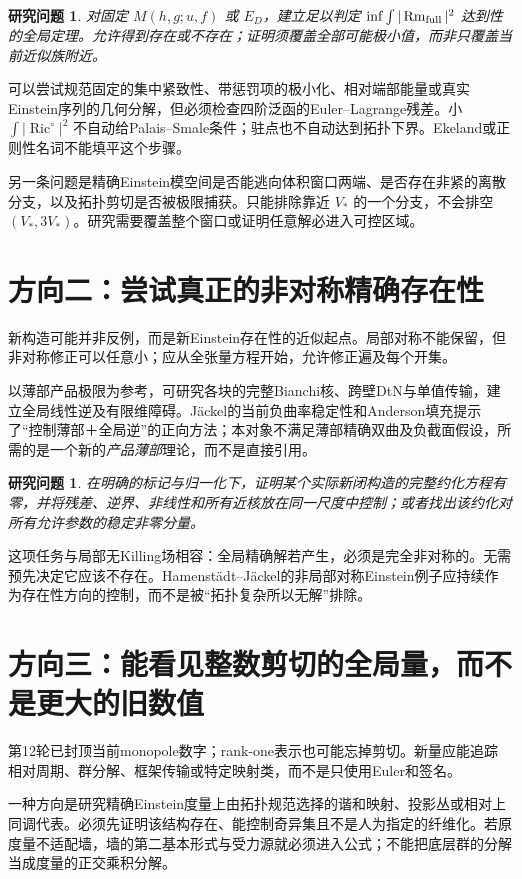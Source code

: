 \documentclass[UTF8,fontset=fandol,zihao=-4]{ctexart}
\theoremstyle{research}
\newtheorem{target}[sourceprop]{研究问题}
\DeclareMathOperator{\Ric}{Ric}\DeclareMathOperator{\Rm}{Rm}
\begin{document}
\begin{target}
对固定 $M(h,g;u,f)$ 或 $E_D$，建立足以判定 $\inf\int|\Rm_{\rm full}|^2$ 达到性的全局定理。允许得到存在或不存在；证明须覆盖全部可能极小值，而非只覆盖当前近似族附近。
\end{target}
可以尝试规范固定的集中紧致性、带惩罚项的极小化、相对端部能量或真实Einstein序列的几何分解，但必须检查四阶泛函的Euler--Lagrange残差。小 $\int|\Ric^\circ|^2$ 不自动给Palais--Smale条件；驻点也不自动达到拓扑下界。Ekeland或正则性名词不能填平这个步骤。

另一条问题是精确Einstein模空间是否能逃向体积窗口两端、是否存在非紧的离散分支，以及拓扑剪切是否被极限捕获。只能排除靠近 $V_*$ 的一个分支，不会排空 $(V_*,3V_*)$。研究需要覆盖整个窗口或证明任意解必进入可控区域。

\section{方向二：尝试真正的非对称精确存在性}
新构造可能并非反例，而是新Einstein存在性的近似起点。局部对称不能保留，但非对称修正可以任意小；应从全张量方程开始，允许修正遍及每个开集。

以薄部产品极限为参考，可研究各块的完整Bianchi核、跨壁DtN与单值传输，建立全局线性逆及有限维障碍。Jäckel的当前负曲率稳定性\cite{Jackel}和Anderson填充\cite{Anderson}提示了“控制薄部＋全局逆”的正向方法；本对象不满足薄部精确双曲及负截面假设，所需的是一个新的\emph{产品薄部}理论，而不是直接引用。

\begin{target}
在明确的标记与归一化下，证明某个实际新闭构造的完整约化方程有零，并将残差、逆界、非线性和所有近核放在同一尺度中控制；或者找出该约化对所有允许参数的稳定非零分量。
\end{target}
这项任务与局部无Killing场相容：全局精确解若产生，必须是完全非对称的。无需预先决定它应该不存在。Hamenstädt--Jäckel的非局部对称Einstein例子\cite{HJ}应持续作为存在性方向的控制，而不是被“拓扑复杂所以无解”排除。

\section{方向三：能看见整数剪切的全局量，而不是更大的旧数值}
第12轮已封顶当前monopole数字；rank-one表示也可能忘掉剪切。新量应能追踪相对周期、群分解、框架传输或特定映射类，而不是只使用Euler和签名。

一种方向是研究精确Einstein度量上由拓扑规范选择的谐和映射、投影丛或相对上同调代表。必须先证明该结构存在、能控制奇异集且不是人为指定的纤维化。若原度量不适配墙，墙的第二基本形式与受力源就必须进入公式；不能把底层群的分解当成度量的正交乘积分解。
\end{document}
